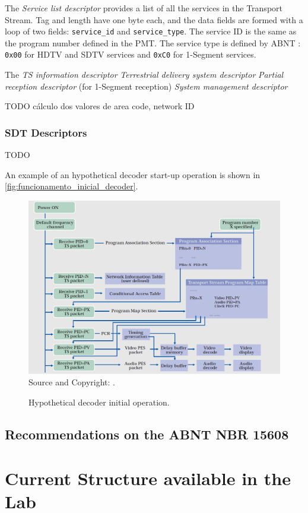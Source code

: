 \documentclass[
	12pt,				%
	openright,			%
	twoside,			%
	a4paper,			%
	brazil,
	french,				%
	english
	]{abntex2}
\begin{document}
The \textit{Service list descriptor} provides a list of all the services in the Transport Stream. Tag and length have one byte each, and the data fields are formed with a loop of two fields: \texttt{service\_id} and \texttt{service\_type}. The service ID is the same as the program number defined in the PMT. The service type is defined by ABNT : \texttt{0x00} for HDTV and SDTV services and \texttt{0xC0} for 1-Segment services.

The \textit{TS information descriptor}
\textit{Terrestrial delivery system descriptor}
\textit{Partial reception descriptor} (for 1-Segment reception)
\textit{System management descriptor}

TODO cálculo dos valores de area code, network ID

\subsection{SDT Descriptors}
\label{nit_descriptors}
TODO

An example of an hypothetical decoder start-up operation is shown in \autoref{fig:funcionamento_inicial_decoder}.

\begin{figure}[!hb]
\centering
\caption{Hypothetical decoder initial operation.}
\includegraphics[width=0.8\linewidth]{figuras/funcionamento_inicial_decoder.png}
\\Source and Copyright: \cite{nhk}.
\label{fig:funcionamento_inicial_decoder}
\end{figure}

\section{Recommendations on the ABNT NBR 15608}


\chapter{Current Structure available in the Lab}
\end{document}

